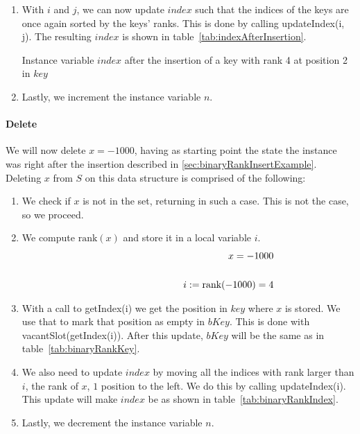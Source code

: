 \begin{enumerate}
    \item
    With $i$ and $j$, we can now update $index$ such that the indices of the keys are once again sorted by the keys' ranks. This is done by calling {\ttfamily updateIndex(i, j)}. The resulting $index$ is shown in table~\ref{tab:indexAfterInsertion}.
    \begin{table}[H]
    \centering
    
    \caption[Example $index$ after the insertion of a new key]{Instance variable $index$ after the insertion of a key with rank 4 at position 2 in $key$}
    \label{tab:indexAfterInsertion}
    \end{table}
    
    \item
    Lastly, we increment the instance variable $n$.
\end{enumerate}

\paragraph{Delete}

We will now delete $x = -1000$, having as starting point the state the instance was right after the insertion described in \ref{sec:binaryRankInsertExample}. Deleting $x$ from $S$ on this data structure is comprised of the following:
\begin{enumerate}
    \item
    We check if $x$ is not in the set, returning in such a case.
    This is not the case, so we proceed.
    
    \item
    We compute $\text{rank}(x)$ and store it in a local variable $i$.
    \begin{align*}
        x = -1000 \\
        \cline{1-2}
        i := \text{rank}(-1000) = 4
    \end{align*}
    
    \item
    With a call to {\ttfamily getIndex(i)} we get the position in $key$ where $x$ is stored. We use that to mark that position as empty in $bKey$. This is done with {\ttfamily vacantSlot(getIndex(i))}. After this update, $bKey$ will be the same as in table~\ref{tab:binaryRankKey}.
    
    \item
    We also need to update $index$ by moving all the indices with rank larger than $i$, the rank of $x$, $1$ position to the left. We do this by calling {\ttfamily updateIndex(i)}. This update will make $index$ be as shown in table~\ref{tab:binaryRankIndex}.
    
    \item
    Lastly, we decrement the instance variable $n$.
\end{enumerate}

